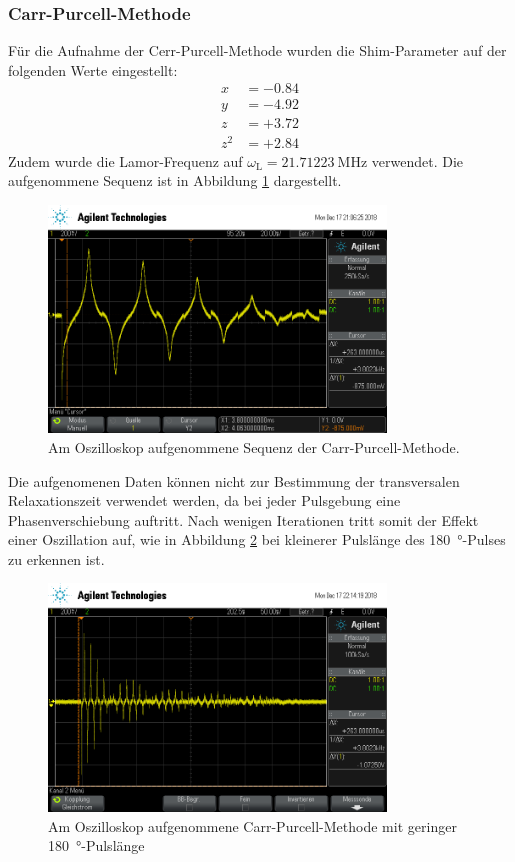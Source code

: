 \subsubsection{Carr-Purcell-Methode}
Für die Aufnahme der Cerr-Purcell-Methode wurden die Shim-Parameter auf der
folgenden Werte eingestellt:
\begin{align*}
  x &= -\num{0.84} \\
  y &= -\num{4.92} \\
  z &= +\num{3.72} \\
  z^2 &= +\num{2.84}
\end{align*}
Zudem wurde die Lamor-Frequenz auf $\omega_\text{L} = \SI{21.71223}{\mega\hertz}$
verwendet. Die aufgenommene Sequenz ist in Abbildung \ref{fig:CP} dargestellt.
\begin{figure}[htb]
  \centering
  \includegraphics[width=0.8\textwidth]{rohdaten/cp_2.png}
  \caption{Am Oszilloskop aufgenommene Sequenz der Carr-Purcell-Methode.}
  \label{fig:CP}
\end{figure}
Die aufgenomenen Daten können nicht zur Bestimmung der transversalen
Relaxationszeit verwendet werden, da bei jeder Pulsgebung eine Phasenverschiebung
auftritt. Nach wenigen Iterationen tritt somit der Effekt einer Oszillation auf,
wie in Abbildung \ref{fig:CP2} bei kleinerer Pulslänge des \SI{180}{\degree}-Pulses
zu erkennen ist.
\begin{figure}[htb]
  \centering
  \includegraphics[width=0.8\textwidth]{rohdaten/cp_3.png}
  \caption{Am Oszilloskop aufgenommene Carr-Purcell-Methode mit geringer
  \SI{180}{\degree}-Pulslänge}
  \label{fig:CP2}
\end{figure}
\FloatBarrier


